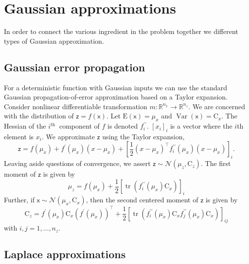 \documentclass{article}
\newcommand{\vv}[1]{\boldsymbol{#1}}
\newcommand{\mm}[1]{\mathrm{#1}}
\newcommand{\rv}[1]{\mathsf{#1}}
\newcommand{\vrv}[1]{\vv{\rv{#1}}}
\begin{document}
\section{Gaussian approximations}

In order to connect the various ingredient in the problem together we different types of Gaussian approximation.

\subsection{Gaussian error propagation}\label{sec:propagation-posterior}

For a deterministic function with Gaussian inputs we can use the standard Gaussian propagation-of-error approximation based on a Taylor expansion.
Consider nonlinear differentiable transformation \(m:\mathbb{R}^{n_{x}}\to\mathbb{R}^{n_{z}}\).
We are concerned with the distribution of \(\vrv{z}=f(\vrv{x})\).
Let \(\mathrm{E}(\vrv{x})=\mu_{x}\) and \(\operatorname{Var}(\vrv{x})=\mm{C}_{x}.\)
The Hessian of the \(i^{\text {th }}\) component of \(f\) is denoted \(f_{i}^{\prime \prime}.\)
\([x_i]_i\) is a vector where the \(i\)th element is \(x_i\).
We approximate \(\vrv{z}\) using the Taylor expansion,
\[\vrv{z}=f\left(\mu_{x}\right)+f^{\prime}\left(\mu_{x}\right)\left(x-\mu_{x}\right)+\left[\frac{1}{2}\left(x-\mu_{x}\right)^{\top} f_{i}^{\prime \prime}\left(\mu_{x}\right)\left(x-\mu_{x}\right)\right]_{i}.\]
Leaving aside questions of convergence, we assert \(\vrv{z}\sim\mathcal{N}(\mu_z,\mm{C}_z)\).
The first moment of \(\vrv{z}\) is given by
\[
\mu_{z}=f\left(\mu_{x}\right)+\frac{1}{2}\left[\operatorname{tr}\left(f_{i}^{\prime \prime}\left(\mu_{x}\right) \mm{C}_{x}\right)\right]_{i}
\]
Further, if \(\vrv{x} \sim \mathcal{N}\left(\mu_{x}, \mm{C}_{x}\right)\), then the second centered moment of \(\vrv{z}\) is given by
\[
\mm{C}_{z}=f^{\prime}\left(\mu_{x}\right) \mm{C}_{x}\left(f^{\prime}\left(\mu_{x}\right)\right)^{\top}+\frac{1}{2}\left[\operatorname{tr}\left(f_{i}^{\prime \prime}\left(\mu_{x}\right) \mm{C}_{x} f_{j}^{\prime \prime}\left(\mu_{x}\right) \mm{C}_{x}\right)\right]_{i j}
\]
with \(i, j=1, \ldots, n_{z}.\)

\subsection{Laplace approximations}\label{sec:laplace-posterior}
\end{document}
